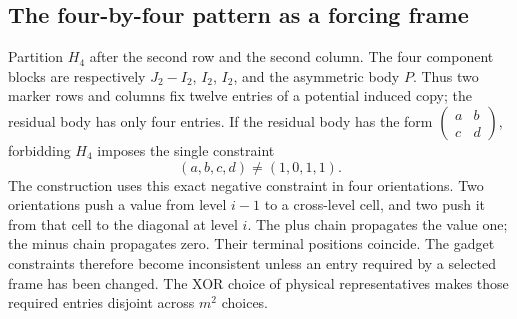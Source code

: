 \subsection{The four-by-four pattern as a forcing frame}
Partition $H_4$ after the second row and the second column. The
four component blocks are respectively $J_2-I_2$, $I_2$, $I_2$,
and the asymmetric body $P$. Thus two marker rows and columns
fix twelve entries of a potential induced copy; the residual body
has only four entries. If the residual body has the form
$\left(\begin{smallmatrix}a&b\\c&d\end{smallmatrix}\right)$,
forbidding $H_4$ imposes the single constraint
\[
 (a,b,c,d)\ne(1,0,1,1).
\]
The construction uses this exact negative constraint in four
orientations.  Two orientations push a value from level $i-1$ to
a cross-level cell, and two push it from that cell to the diagonal
at level $i$.  The plus chain propagates the value one; the minus
chain propagates zero.  Their terminal positions coincide.  The
gadget constraints therefore become inconsistent unless an entry
required by a selected frame has been changed.  The XOR choice of
physical representatives makes those required entries disjoint
across $m^2$ choices.
